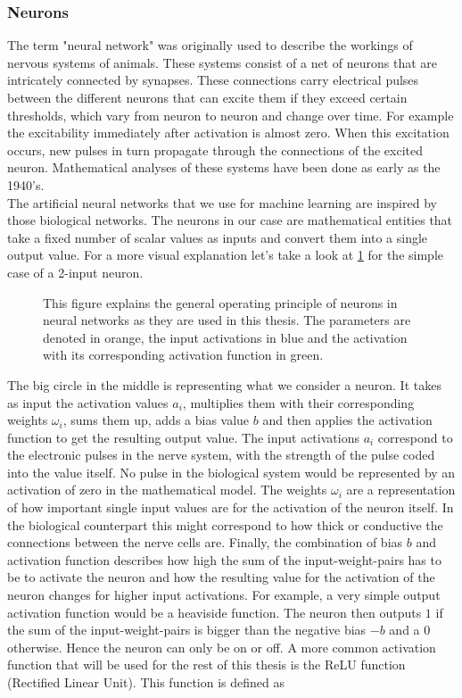\subsubsection{Neurons}
The term "neural network" was originally used to describe the workings of nervous systems of animals. These systems consist of a net of neurons that are intricately connected by synapses. These connections carry electrical pulses between the different neurons that can excite them if they exceed certain thresholds, which vary from neuron to neuron and change over time. For example the excitability immediately after activation is almost zero. When this excitation occurs, new pulses in turn propagate through the connections of the excited neuron. Mathematical analyses of these systems have been done as early as the 1940's.\cite{A_logical_calculus_of_the_ideas_immanent_in_nervous_activity}\\
The artificial neural networks that we use for machine learning are inspired by those biological networks. The neurons in our case are mathematical entities that take a fixed number of scalar values as inputs and convert them into a single output value. For a more visual explanation let's take a look at \cref{fig:Neuron_explanation} for the simple case of a 2-input neuron. 
\begin{figure}
	\centering
	
	\caption{This figure explains the general operating principle of neurons in neural networks as they are used in this thesis. The parameters are denoted in orange, the input activations in blue and the activation with its corresponding activation function in green.}
	\label{fig:Neuron_explanation}
\end{figure}
The big circle in the middle is representing what we consider a neuron. It takes as input the activation values $a_i$, multiplies them with their corresponding weights $\omega_i$, sums them up, adds a bias value $b$ and then applies the activation function to get the resulting output value. The input activations $a_i$ correspond to the electronic pulses in the nerve system, with the strength of the pulse coded into the value itself. No pulse in the biological system would be represented by an activation of zero in the mathematical model. The weights $\omega_i$ are a representation of how important single input values are for the activation of the neuron itself. In the biological counterpart this might correspond to how thick or conductive the connections between the nerve cells are. Finally, the combination of bias $b$ and activation function describes how high the sum of the input-weight-pairs has to be to activate the neuron and how the resulting value for the activation of the neuron changes for higher input activations. For example, a very simple output activation function would be a heaviside function. The neuron then outputs $1$ if the sum of the input-weight-pairs is bigger than the negative bias $-b$ and a 0 otherwise. Hence the neuron can only be on or off. A more common activation function that will be used for the rest of this thesis is the ReLU function (Rectified Linear Unit). This function is defined as 
